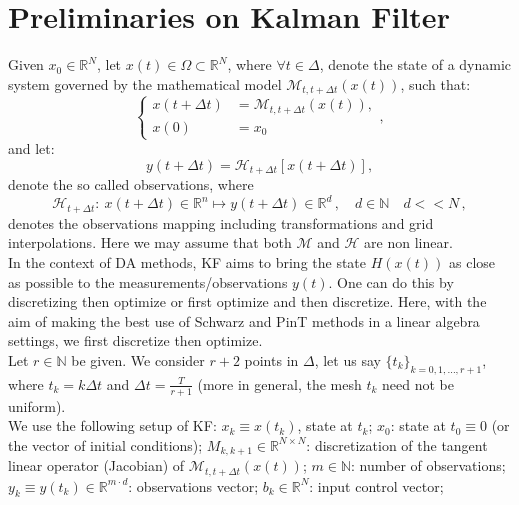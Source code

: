 \documentclass[smallcondensed]{svjour3}
\begin{document}
\section{Preliminaries on Kalman Filter}
Given $x_{0}\in \mathbb{R}^{N}$, let $x(t)\in \Omega \subset \mathbb{R}^{N}$, where $\forall t \in \Delta$, denote the state of a dynamic system governed by the mathematical model $\mathcal{M}_{t,t+\Delta t}( x(t))$, such that:
\begin{equation}\label{modello}
\left\{\begin{array}{ll}
x(t+ \Delta t)&=\mathcal{M}_{t, t+ \Delta t}(x(t)), \\
x(0)&=x_{0}
\end{array}, \right.
\end{equation}  
and let:
\begin{equation}\label{osservazioni}
y(t+\Delta t)=\mathcal{H}_{t+\Delta t}[x(t+\Delta t)],
\end{equation}
denote the so called observations, where 
\begin{equation}
\mathcal{H}_{t+\Delta t}: \ x(t+\Delta t) \in \mathbb{R}^{n}\mapsto y(t+\Delta t) \in \mathbb{R}^{d}\,, \quad d \in \mathbb{N} \quad d <<N \, ,
\end{equation}
denotes the observations mapping including transformations and grid interpolations.  Here we may assume that both $\mathcal{M}$  and $\mathcal{H}$ are non linear. \\
In the context of DA methods, KF aims to bring the state $H(x(t))$ as close as possible to the measurements/observations $y(t)$. One can do this by discretizing  then optimize or first optimize and then discretize. Here, with the aim of making the best use of Schwarz and PinT methods in a linear algebra settings,  we  first discretize then optimize. \\ \noindent Let $r\in \mathbb{N}$ be given. We consider $r+2$ points in $\Delta$, let us say $\{t_{k}\}_{k=0,1,\ldots,r+1}$,  where $t_{k}=k\Delta t$ and $\Delta t= \frac{T}{r+1}$ (more in general, the mesh $t_k$ need not be uniform). \\ \noindent  We use the following setup of  KF: 
\noindent   $x_{k}\equiv x(t_{k})$,  state  at $t_{k}$; 
$ x_{0}$:  state at  $t_{0}\equiv 0$ (or the vector of initial conditions);
$M_{k,k+1}\in \mathbb{R}^{N\times N}$:  discretization of the tangent linear operator (Jacobian) of $\mathcal{M}_{t,t+\Delta t}( x(t))$;
$m\in \mathbb{N}$:  number of observations;
$y_{k}\equiv y(t_{k})\in \mathbb{R}^{m\cdot d}$:  observations vector;
$b_{k}\in \mathbb{R}^{ N}$: input control vector;
\end{document}
